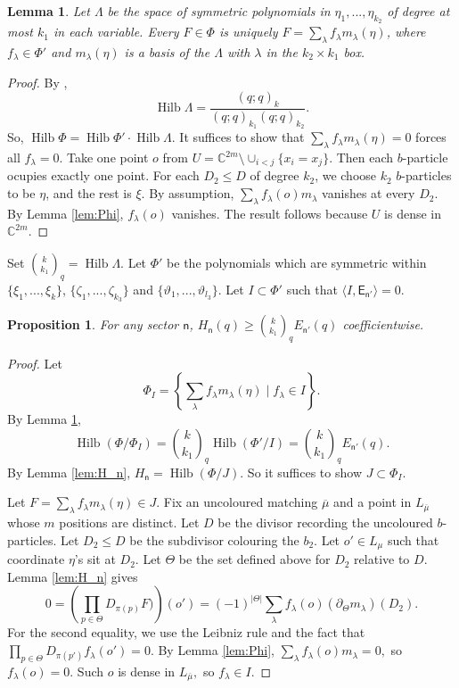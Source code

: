 \documentclass[11pt]{amsart}
\newtheorem{proposition}[theorem]{Proposition}
\newtheorem{lemma}[theorem]{Lemma}
\theoremstyle{definition}
\theoremstyle{remark}
\begin{document}
\begin{lemma}\label{lem:decom of F}
Let $\Lambda$ be the space of symmetric polynomials in $\eta_1,...,\eta_{k_2}$ of degree at most $k_1$ in each variable. Every $F\in \Phi$ is uniquely $F=\sum_{\lambda}f_{\lambda}m_{\lambda}(\eta)$, where $f_\lambda\in \Phi'$ and $m_\lambda(\eta)$ is a basis of the $\Lambda$ with $\lambda$ in the $k_2\times k_1$ box. 	
\end{lemma}
\begin{proof}
By \cite[Theorem 3.1]{Andrews}, \[\operatorname{Hilb}\Lambda=\frac{(q;q)_k}{(q;q)_{k_1}(q;q)_{k_2}}.\] 
So, $\operatorname{Hilb}\Phi=\operatorname{Hilb}\Phi'\cdot \operatorname{Hilb}\Lambda$. 
It suffices to show that $\sum_\lambda f_{\lambda}m_{\lambda}(\eta)=0$ forces all $f_\lambda=0$.  
Take one point $o$ from $U=\mathbb{C}^{2m}\setminus\cup_{i<j}\{x_i=x_j\}.$ Then each $b$-particle ocupies exactly one point. For each $D_2\leq D$ of degree $k_2$, we choose $k_2$ $b$-particles to be $\eta$, and the rest is $\xi$. By assumption, $\sum_{\lambda} f_{\lambda}(o)m_{\lambda}$ vanishes at every $D_2$. By Lemma  \ref{lem:Phi}, $f_\lambda(o)$ vanishes. The result follows because $U$ is dense in $\mathbb{C}^{2m}$. 
\end{proof}
Set $\binom{k}{k_1}_q=\operatorname{Hilb}\Lambda$. Let $\Phi'$ be the polynomials which are symmetric within $\{\xi_1,...,\xi_k\}$, $\{\zeta_1,...,\zeta_{k_3}\}$ and $\{\vartheta_1,...,\vartheta_{l_3}\}$. Let $I\subset \Phi'$ such that $\langle I, \mathsf{E}_{\mathsf n'}\rangle=0$. 
\begin{proposition}\label{prop:H_nlowerbound}
For any sector $\mathsf{n}$, $H_{\mathsf{n}}(q)\geq \binom{k}{k_1}_qE_{\mathsf{n}'}(q)$ coefficientwise. 	
\end{proposition}
\begin{proof}
Let 
\[ \Phi_I=\left\{\sum_\lambda f_{\lambda}m_\lambda(\eta) \mid f_\lambda\in I\right\}.\] 
By Lemma \ref{lem:decom of F}, 
\[ \operatorname{Hilb}(\Phi/\Phi_I)=\binom{k}{k_1}_q \operatorname{Hilb}(\Phi'/I)=\binom{k}{k_1}_q {E}_{\mathsf{n}'}(q).\]
By Lemma \ref{lem:H_n}, $H_{\mathsf{n}}=\operatorname{Hilb}(\Phi/J)$. So it suffices to show $J\subset \Phi_I$. 

Let $F=\sum_{\lambda}f_{\lambda} m_{\lambda}(\eta)\in J$. Fix an uncoloured matching $\overline{\mu}$ and a point in $L_{\overline{\mu}}$ whose $m$ positions are distinct. Let $D$ be the divisor recording the uncoloured $b$-particles. Let $D_2\leq D$ be the subdivisor colouring the $b_2$. Let $o'\in L_{\mu}$ such that coordinate $\eta$'s sit at $D_2$. Let $\Theta$ be the set defined above for $D_2$ relative to $D$. Lemma \ref{lem:H_n} gives 
\[0=\left(\prod_{p\in \Theta}D_{\pi(p)}F)\right)(o')=(-1)^{|\Theta|}\sum_\lambda f_{\lambda}(o)(\partial_{\Theta}m_{\lambda})(D_2).\] 
For the second equality, we use the Leibniz rule and the fact that $\prod_{p\in \Theta}D_{\pi(p')}f_{\lambda}(o')=0$. 
By Lemma \ref{lem:Phi}, $\sum_{\lambda}f_{\lambda}(o)m_{\lambda}=0,$ so $f_{\lambda}(o)=0$. Such $o$ is dense in $L_{\overline{\mu}},$ so $f_{\lambda}\in I$. 
\end{proof}
\end{document}
